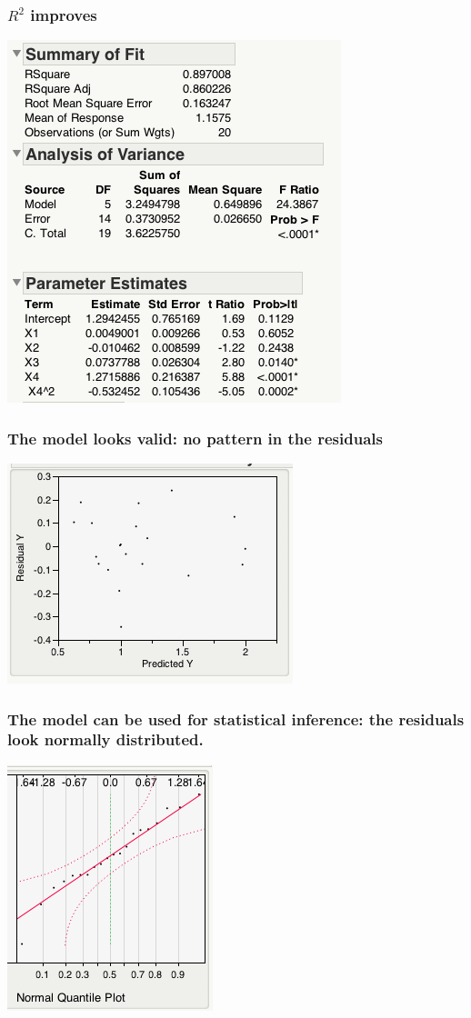 \documentclass[handout]{beamer}
\numberwithin{equation}{section}
\begin{document}
\begin{frame}
\frametitle{$R^2$ improves}
\begin{center}
 \includegraphics{../../fig/x43.png}
\end{center}
\end{frame}

\begin{frame}
\frametitle{The model looks valid: no pattern in the residuals}
\begin{center}
 \includegraphics{../../fig/x44.png}
\end{center}
\end{frame}

\begin{frame}
\frametitle{\small The model can be used for statistical inference: the residuals look normally distributed.}
\begin{center}
 \includegraphics{../../fig/x45.png}
\end{center}
\end{frame}
\end{document}
